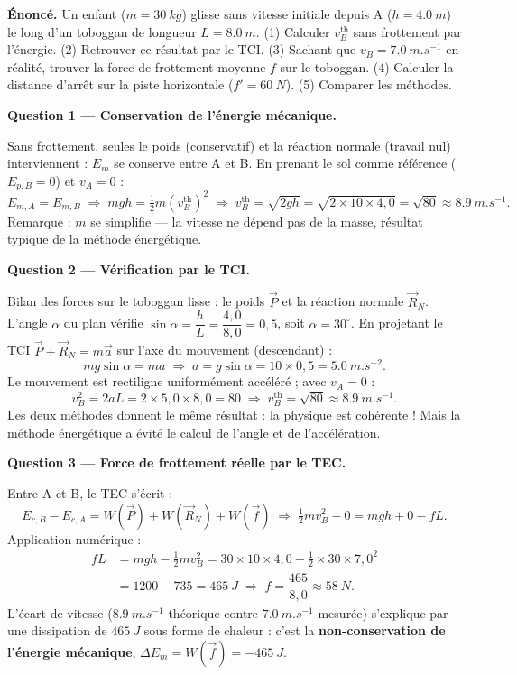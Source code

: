 \documentclass[11pt]{article}
\newcounter{popsec}
\newcounter{popsub}
\newcommand{\courssub}[1]{%
  \stepcounter{popsub}%
  \par\vspace{9pt}\noindent{\popxbold\fontsize{11.5}{13}\selectfont\color{popink}{\color{poporange}\thepopsec.\thepopsub}\hspace{6pt}#1}\par\nopagebreak\vspace{4pt}
}
\begin{document}
\courssub{Démarche et corrigé commenté}

\begin{exoresolu}
\textbf{Énoncé.} Un enfant ($m = \SI{30}{kg}$) glisse sans vitesse initiale depuis A ($h = \SI{4,0}{m}$) le long d'un toboggan de longueur $L = \SI{8,0}{m}$. (1) Calculer $v_B^{\text{th}}$ sans frottement par l'énergie. (2) Retrouver ce résultat par le TCI. (3) Sachant que $v_B = \SI{7,0}{m.s^{-1}}$ en réalité, trouver la force de frottement moyenne $f$ sur le toboggan. (4) Calculer la distance d'arrêt sur la piste horizontale ($f' = \SI{60}{N}$). (5) Comparer les méthodes.

\tcblower

\textbf{Question 1 — Conservation de l'énergie mécanique.}

Sans frottement, seules le poids (conservatif) et la réaction normale (travail nul) interviennent : $E_m$ se conserve entre A et B. En prenant le sol comme référence ($E_{p,B} = 0$) et $v_A = 0$ :
\[
E_{m,A} = E_{m,B} \;\Longrightarrow\; mgh = \tfrac{1}{2}m\left(v_B^{\text{th}}\right)^2
\;\Longrightarrow\; v_B^{\text{th}} = \sqrt{2gh} = \sqrt{2\times 10\times 4{,}0} = \sqrt{80} \approx \SI{8,9}{m.s^{-1}}.
\]
Remarque : $m$ se simplifie — la vitesse ne dépend pas de la masse, résultat typique de la méthode énergétique.

\textbf{Question 2 — Vérification par le TCI.}

Bilan des forces sur le toboggan lisse : le poids $\vec{P}$ et la réaction normale $\vec{R}_N$. L'angle $\alpha$ du plan vérifie $\sin\alpha = \dfrac{h}{L} = \dfrac{4{,}0}{8{,}0} = 0{,}5$, soit $\alpha = 30^{\circ}$. En projetant le TCI $\vec{P} + \vec{R}_N = m\vec{a}$ sur l'axe du mouvement (descendant) :
\[
mg\sin\alpha = ma \;\Longrightarrow\; a = g\sin\alpha = 10\times 0{,}5 = \SI{5,0}{m.s^{-2}}.
\]
Le mouvement est rectiligne uniformément accéléré ; avec $v_A = 0$ :
\[
v_B^2 = 2aL = 2\times 5{,}0\times 8{,}0 = 80 \;\Longrightarrow\; v_B^{\text{th}} = \sqrt{80} \approx \SI{8,9}{m.s^{-1}}.
\]
Les deux méthodes donnent le même résultat : la physique est cohérente ! Mais la méthode énergétique a évité le calcul de l'angle et de l'accélération.

\textbf{Question 3 — Force de frottement réelle par le TEC.}

Entre A et B, le TEC s'écrit :
\[
E_{c,B} - E_{c,A} = W(\vec{P}) + W(\vec{R}_N) + W(\vec{f})
\;\Longrightarrow\; \tfrac{1}{2}mv_B^2 - 0 = mgh + 0 - fL.
\]
Application numérique :
\begin{align*}
fL &= mgh - \tfrac{1}{2}mv_B^2 = 30\times 10\times 4{,}0 - \tfrac{1}{2}\times 30\times 7{,}0^2 \\
&= 1200 - 735 = \SI{465}{J}
\;\Longrightarrow\; f = \dfrac{465}{8{,}0} \approx \SI{58}{N}.
\end{align*}
L'écart de vitesse ($\SI{8,9}{m.s^{-1}}$ théorique contre $\SI{7,0}{m.s^{-1}}$ mesurée) s'explique par une dissipation de $\SI{465}{J}$ sous forme de chaleur : c'est la \textbf{non-conservation de l'énergie mécanique}, $\Delta E_m = W(\vec{f}) = \SI{-465}{J}$.


\end{exoresolu}
\end{document}
